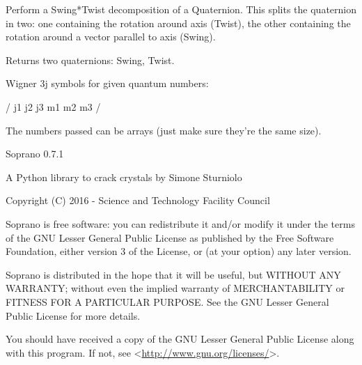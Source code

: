 \documentclass[letterpaper,10pt,english]{sphinxmanual}
\begin{document}

\begin{fulllineitems}
\label{doctree/soprano.utils:soprano.utils.swing_twist_decomp}
Perform a Swing*Twist decomposition of a Quaternion. This splits the
quaternion in two: one containing the rotation around axis (Twist), the
other containing the rotation around a vector parallel to axis (Swing).

Returns two quaternions: Swing, Twist.

\end{fulllineitems}


\begin{fulllineitems}
\label{doctree/soprano.utils:soprano.utils.wigner_3j}
Wigner 3j symbols for given quantum numbers:

/                     \textbar{} j1    j2     j3 \textbar{}
\textbar{} m1    m2     m3 \textbar{}
                /

The numbers passed can be arrays (just make sure they're the
same size).

\end{fulllineitems}

\label{index:module-soprano}
Soprano 0.7.1

A Python library to crack crystals
by Simone Sturniolo

Copyright (C) 2016 - Science and Technology Facility Council

Soprano is free software: you can redistribute it and/or modify
it under the terms of the GNU Lesser General Public License as published by
the Free Software Foundation, either version 3 of the License, or
(at your option) any later version.

Soprano is distributed in the hope that it will be useful,
but WITHOUT ANY WARRANTY; without even the implied warranty of
MERCHANTABILITY or FITNESS FOR A PARTICULAR PURPOSE.  See the
GNU Lesser General Public License for more details.

You should have received a copy of the GNU Lesser General Public License
along with this program.  If not, see \textless{}\url{http://www.gnu.org/licenses/}\textgreater{}.
\end{document}
